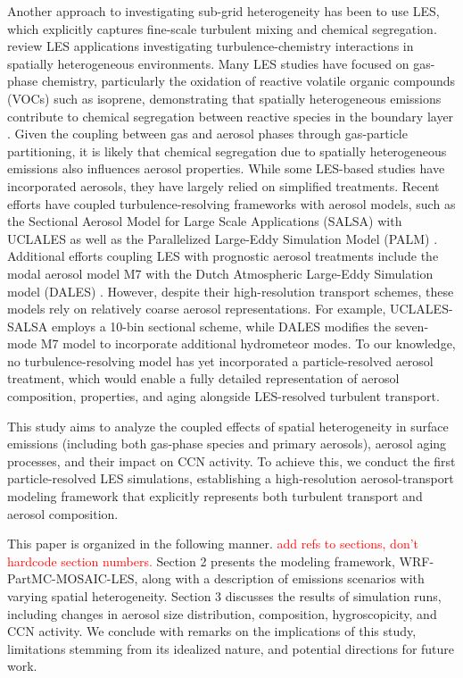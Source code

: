 \documentclass[journal abbreviation, manuscript]{copernicus}
\begin{document}
Another approach to investigating sub-grid heterogeneity has been to use
LES, which explicitly captures fine-scale turbulent mixing and
chemical segregation.  \citet{brasseur_segregation_2023} review LES
applications investigating turbulence-chemistry interactions in
spatially heterogeneous environments.  Many LES studies have focused
on gas-phase chemistry, particularly the oxidation of reactive
volatile organic compounds (VOCs) such as isoprene, demonstrating that
spatially heterogeneous emissions contribute to chemical segregation
between reactive species in the boundary layer
\citep{ouwersloot_segregation_2011, kaser_chemistry-turbulence_2015}.
Given the coupling between gas and aerosol phases through gas-particle
partitioning, it is likely that chemical segregation due to spatially
heterogeneous emissions also influences aerosol properties. While some
LES-based studies have incorporated aerosols, they have largely relied
on simplified treatments. Recent efforts have coupled
turbulence-resolving frameworks with aerosol models, such as the
Sectional Aerosol Model for Large Scale Applications (SALSA)
\citep{kokkola_salsa_2008} with UCLALES
\citep{tonttila_uclalessalsa_2017} as well as the Parallelized Large-Eddy
Simulation Model (PALM) \citep{kurppa_implementation_2019}. Additional efforts coupling LES with prognostic aerosol treatments include the modal aerosol model M7 \citep{vignati_m7_2004} with the Dutch Atmospheric Large-Eddy Simulation model (DALES)
\citep{de_bruine_explicit_2019}. However, despite their
high-resolution transport schemes, these models rely on relatively
coarse aerosol representations. For example, UCLALES-SALSA employs a
10-bin sectional scheme, while DALES modifies the seven-mode M7 model
to incorporate additional hydrometeor modes. To our knowledge, no
turbulence-resolving model has yet incorporated a particle-resolved
aerosol treatment, which would enable a fully detailed representation
of aerosol composition, properties, and aging alongside LES-resolved
turbulent transport.

This study aims to analyze the coupled effects of spatial
heterogeneity in surface emissions (including both gas-phase species
and primary aerosols), aerosol aging processes, and their impact on
CCN activity. To achieve this, we conduct the first particle-resolved
LES simulations, establishing a high-resolution aerosol-transport
modeling framework that explicitly represents both turbulent transport
and aerosol composition.

This paper is organized in the following manner. \textcolor{red}{add
  refs to sections, don't hardcode section numbers.} Section 2
presents the modeling framework, WRF-PartMC-MOSAIC-LES, along with a
description of emissions scenarios with varying spatial
heterogeneity. Section 3 discusses the results of simulation runs,
including changes in aerosol size distribution, composition,
hygroscopicity, and CCN activity. We conclude with remarks on the
implications of this study, limitations stemming from its idealized
nature, and potential directions for future work.
\end{document}
